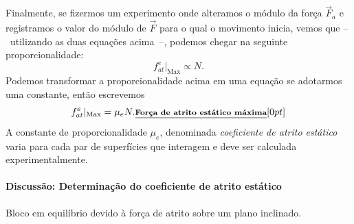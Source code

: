 Finalmente, se fizermos um experimento onde alteramos o módulo da força $\vec{F}_a$ e registramos o valor do módulo de $\vec{F}$ para o qual o movimento inicia, vemos que --~utilizando as duas equações acima~--, podemos chegar na seguinte proporcionalidade:
\begin{equation}
    f_{at}^e|_{\textrm{Max}} \propto N.
\end{equation}
%
Podemos transformar a proporcionalidade acima em uma equação se adotarmos uma constante, então escrevemos
\begin{equation}
  f_{at}^e|_{\textrm{Max}} = \mu_e N. \relax{\footnotesize\emph{\textbf{Força de atrito estático máxima}}}[0pt]
\end{equation}
%
A constante de proporcionalidade $\mu_e$, denominada \emph{coeficiente de atrito estático} varia para cada par de superfícies que interagem e deve ser calculada experimentalmente.


\paragraph{Discussão: Determinação do coeficiente de atrito estático}

\begin{marginfigure}[5cm]
\centering
{}
\caption{Bloco em equilíbrio devido à força de atrito sobre um plano inclinado.}
\end{marginfigure}

